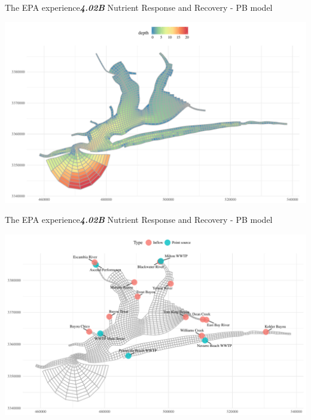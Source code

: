 \documentclass[serif]{beamer}\usepackage[]{graphicx}\usepackage[]{color}
\makeatletter
\def\maxwidth{ %
  \ifdim\Gin@nat@width>\linewidth
    \linewidth
  \else
    \Gin@nat@width
  \fi
}
\newcommand{\emtxt}[1]{\textbf{\textit{#1}}}
\makeatother
\begin{document}
\begin{frame}{The EPA experience}{\emtxt{4.02B} Nutrient Response and Recovery - PB model}


{\centering \includegraphics[width=\maxwidth]{fig/unnamed-chunk-4-1} 

}



\end{frame}


\begin{frame}{The EPA experience}{\emtxt{4.02B} Nutrient Response and Recovery - PB model}


{\centering \includegraphics[width=\maxwidth]{fig/unnamed-chunk-5-1} 

}



\end{frame}
\end{document}
